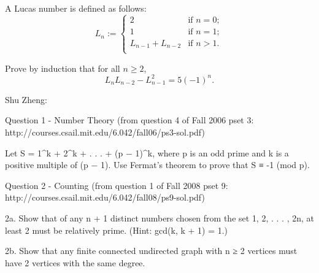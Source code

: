 \begin{problem}[Induction]

A Lucas number is defined as follows:
\begin{equation}
  L_n :=
  \begin{cases}
    2               & \text{if } n = 0; \\
    1               & \text{if } n = 1; \\
    L_{n-1}+L_{n-2} & \text{if } n > 1. \\
   \end{cases}
\end{equation}

Prove by induction that for all $n \geq 2$,
\[
L_n L_{n-2} - L_{n-1}^2 = 5 (-1)^n.
\]
\end{problem}


Shu Zheng:

Question 1 - Number Theory (from question 4 of Fall 2006 pset 3:
http://courses.csail.mit.edu/6.042/fall06/ps3-sol.pdf)

Let S = 1^k + 2^k + . . . + (p − 1)^k, where p is an odd prime and k
is a positive multiple of (p − 1). Use Fermat’s theorem to prove that
S ≡ -1 (mod p).

Question 2 - Counting (from question 1 of Fall 2008 pset 9:
http://courses.csail.mit.edu/6.042/fall08/ps9-sol.pdf)

2a. Show that of any n + 1 distinct numbers chosen from the set {1, 2,
  . . . , 2n}, at least 2 must be relatively prime. (Hint: gcd(k, k +
1) = 1.)

2b. Show that any finite connected undirected graph with n ≥ 2
vertices must have 2 vertices with the same degree.


